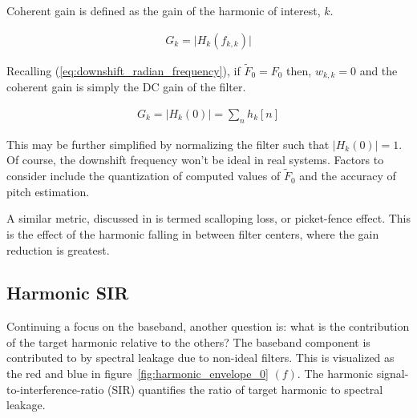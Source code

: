 \documentclass [11pt, proquest,oneside] {ganter_thesis}[2015/03/03]
\begin{document}
Coherent gain is defined as the gain of the harmonic of interest, $k$.

\begin{align}
G_k = \Big| H_k(f_{k,k}) \Big|
\end{align}

Recalling (\ref{eq:downshift_radian_frequency}), if $\tilde{F}_0 = F_0$ then, $w_{k,k} = 0$ and the coherent gain is simply the DC gain of the filter.

\begin{align}
G_k = \Big| H_k(0) \Big| = \sum_n h_k[n]
\end{align}

This may be further simplified by normalizing the filter such that $\Big| H_k(0) \Big| = 1$.  Of course, the downshift frequency won't be ideal in real systems.  Factors to consider include the quantization of computed values of $\tilde{F}_0$ and the accuracy of pitch estimation.

A similar metric, discussed in \cite{harris1978use} is termed scalloping loss, or picket-fence effect.  This is the effect of the harmonic falling in between filter centers, where the gain reduction is greatest.





\subsection{Harmonic SIR}

Continuing a focus on the baseband, another question is: what is the contribution of the target harmonic relative to the others?  The baseband component is contributed to by spectral leakage due to non-ideal filters.  This is visualized as the red and blue in figure~\ref{fig:harmonic_envelope_0} $(f)$.  The harmonic signal-to-interference-ratio (SIR) quantifies the ratio of target harmonic to spectral leakage.
\end{document}

